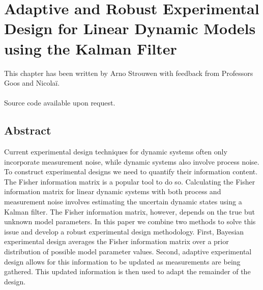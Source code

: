 \chapter{Adaptive and Robust Experimental Design for Linear Dynamic Models using the Kalman Filter}
\label{paper3}
This chapter has been written by Arno Strouwen with feedback from Professors Goos and Nicolaï.
\\
\\
{\color{red}Source code available upon request.}
\section*{Abstract}
Current experimental design techniques for dynamic systems often only incorporate measurement noise, {\color{red}while} dynamic systems also involve process noise. To construct experimental designs we need to quantify their information content. The Fisher information matrix is a popular tool to do so. Calculating the Fisher information matrix for linear dynamic systems with both process and measurement noise involves estimating the uncertain dynamic states using a Kalman filter. The Fisher information matrix, however, depends on the true but unknown model parameters. In this paper we combine two methods to solve this issue and develop a robust experimental design methodology. First, Bayesian experimental design averages the Fisher information matrix over a prior distribution of possible model parameter values. Second, adaptive experimental design allows for this information to be updated as measurements are being gathered. This updated information is then used to adapt the remainder of the design.
